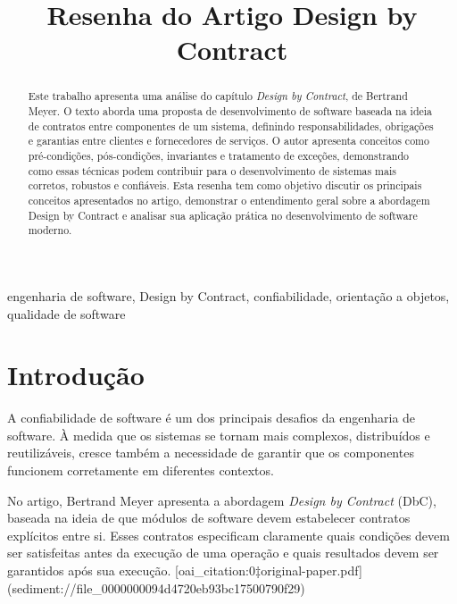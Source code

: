 \documentclass[conference]{IEEEtran}
\begin{document}
\title{Resenha do Artigo Design by Contract}

\author{
}

\maketitle

\begin{abstract}

Este trabalho apresenta uma análise do capítulo \textit{Design by Contract}, de Bertrand Meyer. O texto aborda uma proposta de desenvolvimento de software baseada na ideia de contratos entre componentes de um sistema, definindo responsabilidades, obrigações e garantias entre clientes e fornecedores de serviços. O autor apresenta conceitos como pré-condições, pós-condições, invariantes e tratamento de exceções, demonstrando como essas técnicas podem contribuir para o desenvolvimento de sistemas mais corretos, robustos e confiáveis. Esta resenha tem como objetivo discutir os principais conceitos apresentados no artigo, demonstrar o entendimento geral sobre a abordagem Design by Contract e analisar sua aplicação prática no desenvolvimento de software moderno.

\end{abstract}

\begin{IEEEkeywords}
engenharia de software, Design by Contract, confiabilidade, orientação a objetos, qualidade de software
\end{IEEEkeywords}

\section{Introdução}

A confiabilidade de software é um dos principais desafios da engenharia de software. À medida que os sistemas se tornam mais complexos, distribuídos e reutilizáveis, cresce também a necessidade de garantir que os componentes funcionem corretamente em diferentes contextos.

No artigo, Bertrand Meyer apresenta a abordagem \textit{Design by Contract} (DbC), baseada na ideia de que módulos de software devem estabelecer contratos explícitos entre si. Esses contratos especificam claramente quais condições devem ser satisfeitas antes da execução de uma operação e quais resultados devem ser garantidos após sua execução.  [oai_citation:0‡original-paper.pdf](sediment://file_0000000094d4720eb93bc17500790f29)
\end{document}
